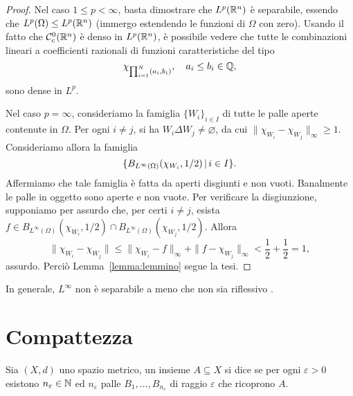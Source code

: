 \begin{proof}
	Nel caso $1 \leq p < \infty$, basta dimostrare che $L^p(\mathbb{R}^n)$ è separabile, essendo che $L^p(\Omega) \leq L^p(\mathbb{R}^n)$ (immergo estendendo le funzioni di $\Omega$ con zero). Usando il fatto che $\mathcal{C}^0_c(\mathbb{R}^n)$ è denso in $L^p(\mathbb{R}^n)$, è possibile vedere che tutte le combinazioni lineari a coefficienti razionali di funzioni caratteristiche del tipo
	\begin{equation*}
		\chi_{\prod_{i=1}^N (a_i,b_i)}, \quad a_i \leq b_i \in \mathbb{Q},
	\end{equation*}
	sono dense in $L^p$.

	Nel caso $p=\infty$, consideriamo la famiglia $\{W_i\}_{i \in I}$ di tutte le palle aperte contenute in $\Omega$. Per ogni $i \neq j$, si ha $W_i \Delta W_j \neq \varnothing$, da cui $\|\chi_{W_i} - \chi_{W_j}\|_\infty \geq 1$. Consideriamo allora la famiglia
	\begin{equation*}
		\{ B_{L^\infty(\Omega)}(\chi_{W_i}, 1/2) \,|\, i \in I\}.
	\end{equation*}
	Affermiamo che tale famiglia è fatta da aperti disgiunti e non vuoti. Banalmente le palle in oggetto sono aperte e non vuote. Per verificare la disgiunzione, supponiamo per assurdo che, per certi $i \neq j$, esista $f \in B_{L^\infty(\Omega)}(\chi_{W_i}, 1/2) \cap B_{L^\infty(\Omega)}(\chi_{W_j}, 1/2)$. Allora
	\begin{equation*}
			\| \chi_{W_i} - \chi_{W_j} \| \leq \|\chi_{W_i} - f\|_\infty + \|f-\chi_{W_j}\|_\infty < \frac12 + \frac12 = 1,
	\end{equation*}
	assurdo. Perciò Lemma~\ref{lemma:lemmino} segue la tesi.
\end{proof}

\begin{remark}
	In generale, $L^\infty$ non è separabile a meno che non sia riflessivo \cite[103]{brezis2010functional}.
\end{remark}

\section{Compattezza}
\begin{definition}
	Sia $(X,d)$ uno spazio metrico, un insieme $A \subseteq X$ si dice  se per ogni $\varepsilon > 0$ esistono $n_\varepsilon \in \mathbb{N}$ ed $n_\varepsilon$ palle $B_1, \ldots, B_{n_\varepsilon}$ di raggio $\varepsilon$ che ricoprono $A$.
\end{definition}

